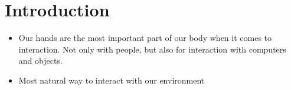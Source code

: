 
\lhead[\chaptername~\thechapter]{\rightmark}


\rhead[\leftmark]{}


\lfoot[\thepage]{}


\cfoot{}


\rfoot[]{\thepage}


\chapter{Introduction}

\begin{itemize}
\item Our hands are the most important part of our body when it comes to interaction. Not only with people, but also for interaction with computers and objects.
\item Most natural way to interact with our environment

\end{itemize}

